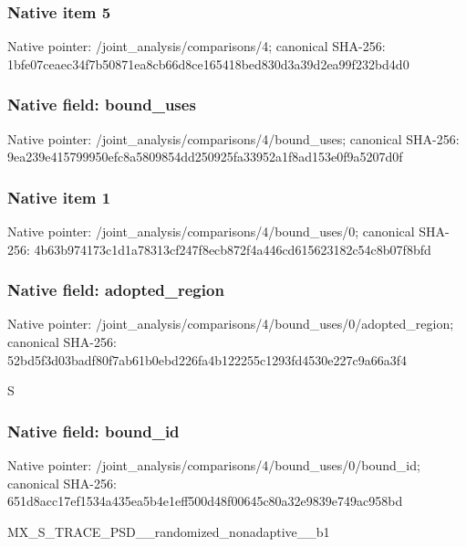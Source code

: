 \documentclass[10pt,a4paper]{article}
\begin{document}
\subsubsection{Native item 5}
Native pointer: /joint\_\allowbreak{}analysis/comparisons/4; canonical SHA-256: 1bfe07ceaec34f7b50871ea8cb66d8ce165418bed830d3a39d2ea99f232bd4d0

\subsubsection{Native field: bound\_\allowbreak{}uses}
Native pointer: /joint\_\allowbreak{}analysis/comparisons/4/bound\_\allowbreak{}uses; canonical SHA-256: 9ea239e415799950efc8a5809854dd250925fa33952a1f8ad153e0f9a5207d0f

\subsubsection{Native item 1}
Native pointer: /joint\_\allowbreak{}analysis/comparisons/4/bound\_\allowbreak{}uses/0; canonical SHA-256: 4b63b974173c1d1a78313cf247f8ecb872f4a446cd615623182c54c8b07f8bfd

\subsubsection{Native field: adopted\_\allowbreak{}region}
Native pointer: /joint\_\allowbreak{}analysis/comparisons/4/bound\_\allowbreak{}uses/0/adopted\_\allowbreak{}region; canonical SHA-256: 52bd5f3d03badf80f7ab61b0ebd226fa4b122255c1293fd4530e227c9a66a3f4

\begingroup\raggedright\sloppy S\par\endgroup

\subsubsection{Native field: bound\_\allowbreak{}id}
Native pointer: /joint\_\allowbreak{}analysis/comparisons/4/bound\_\allowbreak{}uses/0/bound\_\allowbreak{}id; canonical SHA-256: 651d8acc17ef1534a435ea5b4e1eff500d48f00645c80a32e9839e749ac958bd

\begingroup\raggedright\sloppy MX\_\allowbreak{}S\_\allowbreak{}TRACE\_\allowbreak{}PSD\_\allowbreak{}\_\allowbreak{}randomized\_\allowbreak{}nonadaptive\_\allowbreak{}\_\allowbreak{}b1\par\endgroup
\end{document}
